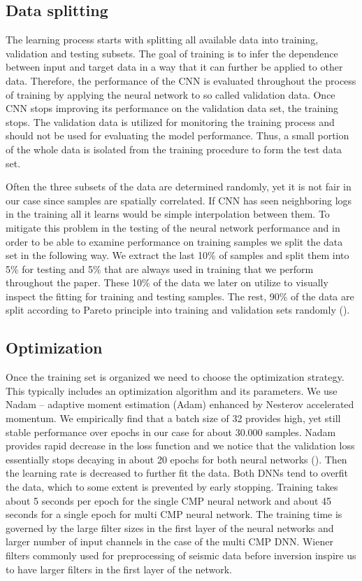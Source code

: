\documentclass[manuscript]{geophysics}
\begin{document}
\subsection{Data splitting}
The learning process starts with splitting all available data into training, validation and testing subsets. 
The goal of training is
to infer the dependence between input and target data in a way that it can further be applied to other data. Therefore, the performance of the CNN is evaluated throughout the process of training by applying the neural network to so called validation data. Once CNN stops improving its performance on the validation data set, the training stops. The validation data is utilized for monitoring the training process and should not be used for evaluating the model performance.   Thus, a small portion of the whole data is isolated from the training procedure to form the test data set. 

Often the three subsets of the data are determined randomly, yet it is not fair in our case since samples are spatially correlated. If CNN has seen neighboring logs in the training all it learns would be simple interpolation between them. To mitigate this problem in the testing of the neural network performance and in order to be able to examine performance on training samples we split the data set in the following way. We extract the last 10\% of samples and split them into 5\% for testing and 5\% that are always used in training that we perform throughout the paper. These 10\% of the data we later on utilize to visually inspect the fitting for training and testing samples. The rest, 90\% of the data are split according to Pareto principle \citep{dunford2014pareto} into training and validation sets randomly ().


\subsection{Optimization}
Once the training set is organized we need to choose the optimization strategy. This typically includes an optimization algorithm and its parameters. We use Nadam \citep{dozat2016incorporating} -- adaptive moment estimation (Adam) enhanced by Nesterov accelerated momentum. We empirically find that a batch size of 32 provides high, yet still stable performance over epochs in our case for about 30.000 samples. Nadam provides rapid decrease in the loss function and we notice that the validation loss essentially stops decaying in about 20 epochs for both neural networks  (). Then the learning rate is decreased to further fit the data. Both DNNs tend to overfit the data, which to some extent is prevented by early stopping. Training takes about 5 seconds per epoch for the single CMP neural network and about 45 seconds for a single epoch for multi CMP neural network. The training time is governed by the large filter sizes in the first layer of the neural networks and larger number of input channels in the case of the multi CMP DNN. Wiener filters commonly used for preprocessing of seismic data before inversion \citep{claerbout1985fundamentals} inspire us to have larger filters in the first layer of the network. 
\end{document}
